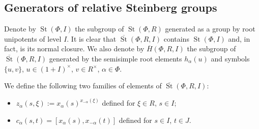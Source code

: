 \documentclass[oneside, 8pt]{amsart}
\theoremstyle{remark}
\theoremstyle{definition}
\numberwithin{lemma}{section}
\numberwithin{prop}{section}
\numberwithin{corollary}{section}
\numberwithin{externaltheorem}{section}
\DeclareMathOperator{\St}{St}
\numberwithin{equation}{section}
\begin{document}
\subsection{Generators of relative Steinberg groups}
Denote by $\St(\Phi, I)$ the subgroup of $\St(\Phi, R)$ generated as a group by root unipotents of level $I$.
It is clear that $\overline{\St}(\Phi, R, I)$ contains $\St(\Phi, I)$ and, in fact, is its normal closure.
We also denote by $\overline{H}(\Phi, R, I)$ the subgroup of $\overline{\St}(\Phi, R, I)$ generated by the semisimple root elements $h_\alpha(u)$ and symbols $\{u, v\}$, $u \in (1+I)^\times$, $v \in R^\times$, $\alpha\in \Phi$.

We define the following two families of elements of $\overline{\St}(\Phi, R, I)$:
\begin{itemize}
 \item $z_\alpha(s, \xi) := x_\alpha(s)^{x_{-\alpha}(\xi)}$ defined for $\xi \in R$, $s \in I$;
 \item $c_\alpha(s, t) = [x_\alpha(s), x_{-\alpha}(t)]$ defined for $s \in I$, $t \in J$.
\end{itemize}
\end{document}

